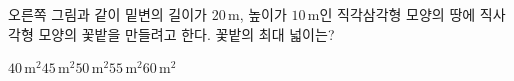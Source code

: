 \noindent\begin{minipage}[t]{0.58\linewidth}\vspace{0pt}\raggedright 오른쪽 그림과 같이 밑변의 길이가 $20\,\mathrm{m}$, 높이가 $10\,\mathrm{m}$인 직각삼각형 모양의 땅에 직사각형 모양의 꽃밭을 만들려고 한다. 꽃밭의 최대 넓이는?\end{minipage}\hfill\begin{minipage}[t]{0.4\linewidth}\vspace{0pt}\centering \resizebox{\ifdim\width>\linewidth\linewidth\else\width\fi}{!}{}\end{minipage}\par
\begin{choices32}{$40\,\mathrm{m}^2$}{$45\,\mathrm{m}^2$}{$50\,\mathrm{m}^2$}{$55\,\mathrm{m}^2$}{$60\,\mathrm{m}^2$}\end{choices32}

